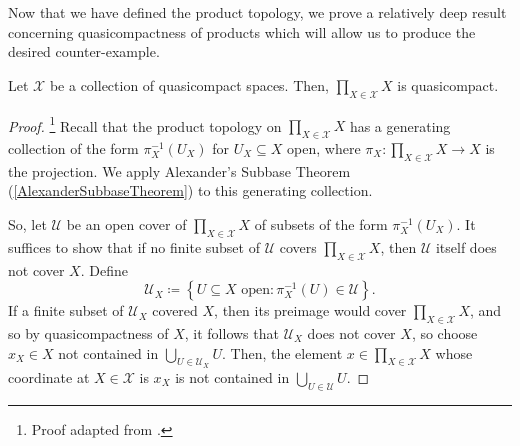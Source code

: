 Now that we have defined the product topology, we prove a relatively deep result concerning quasicompactness of products which will allow us to produce the desired counter-example.
\begin{thm}\label{TychnoffsTheorem}
Let $\mathcal{X}$ be a collection of quasicompact spaces.  Then, $\prod _{X\in \mathcal{X}}X$ is quasicompact.
\begin{proof}\footnote{Proof adapted from \cite[pg.~143]{Kelley}.}
Recall that the product topology on $\prod _{X\in \mathcal{X}}X$ has a generating collection of the form $\pi _X^{-1}(U_X)$ for $U_X\subseteq X$ open, where $\pi _X:\prod _{X\in \mathcal{X}}X\rightarrow X$ is the projection.  We apply Alexander's Subbase Theorem (\cref{AlexanderSubbaseTheorem}) to this generating collection.

So, let $\mathcal{U}$ be an open cover of $\prod _{X\in \mathcal{X}}X$ of subsets of the form $\pi _X^{-1}(U_X)$.  It suffices to show that if no finite subset of $\mathcal{U}$ covers $\prod _{X\in \mathcal{X}}X$, then $\mathcal{U}$ itself does not cover $X$.  Define
\begin{equation}
\mathcal{U}_X\coloneqq \left\{ U\subseteq X\text{ open}:\pi _X^{-1}(U)\in \mathcal{U}\right\} .
\end{equation}
If a finite subset of $\mathcal{U}_X$ covered $X$, then its preimage would cover $\prod _{X\in \mathcal{X}}X$, and so by quasicompactness of $X$, it follows that $\mathcal{U}_X$ does not cover $X$, so choose $x_X\in X$ not contained in $\bigcup _{U\in \mathcal{U}_X}U$.  Then, the element $x\in \prod _{X\in \mathcal{X}}X$ whose coordinate at $X\in \mathcal{X}$ is $x_X$ is not contained in $\bigcup _{U\in \mathcal{U}}U$.
\end{proof}
\end{thm}

